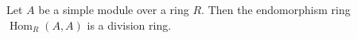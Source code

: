 Let $A$ be a simple module over a ring $R$. Then the endomorphism ring $\operatorname{Hom}_R(A,A)$ is a division ring.
